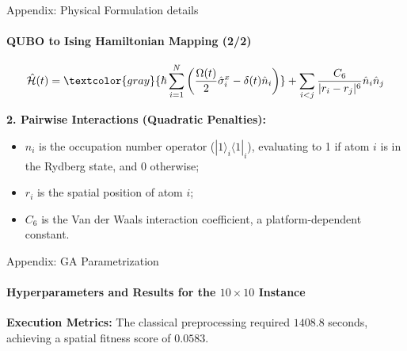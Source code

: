 \documentclass[10pt, aspectratio=169]{beamer}
\begin{document}
\begin{frame}{Appendix: Physical Formulation details}
\framesubtitle{QUBO to Ising Hamiltonian Mapping (2/2)}

    \begin{equation}
    \hat{\mathcal{H}}(t) = \textcolor{gray}{\hbar\sum_{i=1}^{N}\left(\frac{\Omega(t)}{2}\hat{\sigma}_{i}^{x}-\delta(t)\hat{n}_{i}\right)} + \sum_{i<j}\frac{C_{6}}{|r_{i}-r_{j}|^{6}}\hat{n}_{i}\hat{n}_{j}
    \end{equation}

    \vspace{0.2cm}
    \textbf{2. Pairwise Interactions (Quadratic Penalties):}
    \begin{itemize}
        \item $\hat{n}_{i}$ is the occupation number operator ($|1\rangle_i\langle 1|_i$), evaluating to 1 if atom $i$ is in the Rydberg state, and 0 otherwise;
        \item $r_i$ is the spatial position of atom $i$;
        \item $C_6$ is the Van der Waals interaction coefficient, a platform-dependent constant.
    \end{itemize}
\end{frame}


\begin{frame}{Appendix: GA Parametrization}
\framesubtitle{Hyperparameters and Results for the $10 \times 10$ Instance}
    \textbf{Execution Metrics:} The classical preprocessing required $1408.8$ seconds, achieving a spatial fitness score of $0.0583$.
    \vspace{0.2cm}
    
    \begin{table}[]
        \centering
        \renewcommand{\arraystretch}{1.2}
    \end{table}
\end{frame}
\end{document}
